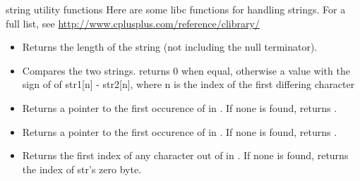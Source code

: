 \documentclass[10pt,graphics,aspectratio=169,table]{beamer}
\begin{document}
\begin{frame}[fragile]{string utility functions}
    Here are some libc functions for handling strings. For a full list, see
    \url{http://www.cplusplus.com/reference/clibrary/}
    \begin{itemize}
        \item {}
    
        Returns the length of the string (not including the null terminator).
    
        \item {}
        
        Compares the two strings. returns 0 when equal, otherwise 
        a value with the sign of of str1[n] - str2[n], where n is the index 
        of the first differing character 
        
        \item {}
        
        Returns a pointer to the first occurence of  in .
        If none is found, returns .

        \item {}
        
        Returns a pointer to the first occurence of  in .
        If none is found, returns .

        \item {}
        
        Returns the first index of any character out of  
        in . If none is found, returns the index of str's zero byte.
    \end{itemize}
 
\end{frame}
\end{document}
